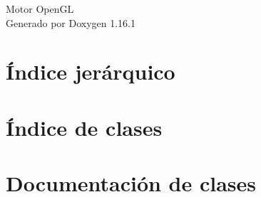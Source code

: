 \documentclass[twoside]{book}
\newcommand{\+}{\discretionary{\mbox{\scriptsize$\hookleftarrow$}}{}{}}
\newcommand{\clearemptydoublepage}{%
    \newpage{\pagestyle{empty}\cleardoublepage}%
  }
\begin{document}
  \raggedbottom
    \hypersetup{pageanchor=false,
                bookmarksnumbered=true,
                pdfencoding=unicode
               }
  \begin{titlepage}
  \vspace*{7cm}
  \begin{center}%
  {\Large Motor Open\+GL}\\
  \vspace*{1cm}
  {\large Generado por Doxygen 1.16.1}\\
  \end{center}
  \end{titlepage}
  \clearemptydoublepage
  \tableofcontents
  \clearemptydoublepage
  \hypersetup{pageanchor=true}





\chapter{Índice jerárquico}

\chapter{Índice de clases}

\chapter{Documentación de clases}















  \backmatter
  \newpage
  \clearemptydoublepage
  \printindex
\end{document}
